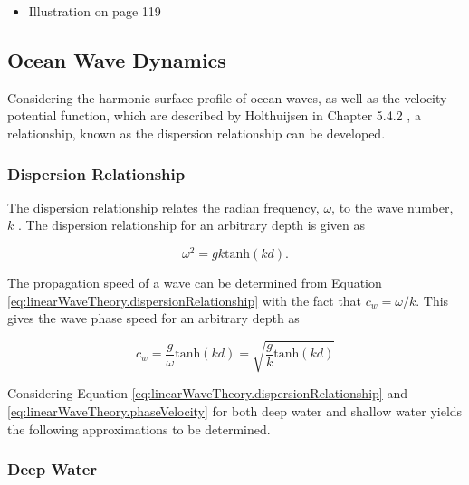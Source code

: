 \begin{itemize}
    \item Illustration on page 119
\end{itemize}


\subsection{Ocean Wave Dynamics} \label{subsec:theory.waves.dynamics}

Considering the harmonic surface profile of ocean waves, as well as the velocity potential function, which are described by Holthuijsen in Chapter 5.4.2 \cite{Holthuijsen2007}, a relationship, known as the dispersion relationship can be developed.

\subsubsection{Dispersion Relationship} \label{subsec:theory.waves.dynamics.dispersionRelationship}

The dispersion relationship relates the radian frequency, $\omega$, to the wave number, $k$ \cite{Holthuijsen2007}. The dispersion relationship for an arbitrary depth is given as 

\begin{equation} \label{eq:linearWaveTheory.dispersionRelationship}
    \omega ^2 = gk\text{tanh}(kd).
\end{equation}

The propagation speed of a wave can be determined from Equation \ref{eq:linearWaveTheory.dispersionRelationship} with the fact that $c_{w} = \omega / k$. This gives the wave phase speed for an arbitrary depth as

\begin{equation} \label{eq:linearWaveTheory.phaseVelocity}
    c_{w} = \frac{g}{\omega}\text{tanh}(kd) = \sqrt{\frac{g}{k}\text{tanh}(kd)}
\end{equation}

Considering Equation \ref{eq:linearWaveTheory.dispersionRelationship} and \ref{eq:linearWaveTheory.phaseVelocity} for both deep water and shallow water yields the following approximations to be determined.

\subsubsection{Deep Water} \label{subsec:theory.waves.linearWaveTheory.deepWater}

